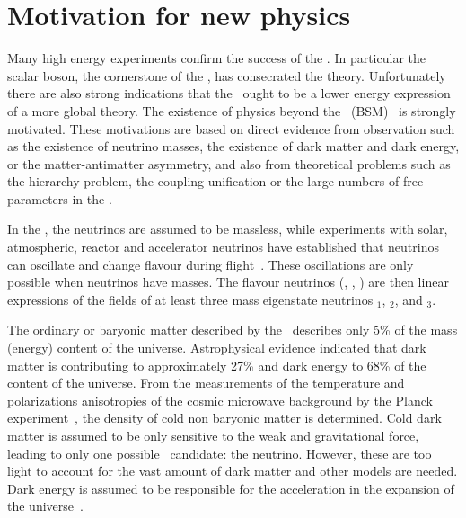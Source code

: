 


\clearpage
\section{Motivation for new physics}
\label{sec:BSM}
Many high energy experiments confirm the success of the \SM. In particular the scalar boson, the cornerstone of the \SM, has consecrated the theory. Unfortunately there are also strong indications that the \SM\ ought to be a lower energy expression of a more global theory. The existence of physics beyond the \SM\ (BSM)~\cite{BSMWiley} is strongly motivated. These motivations are based on direct evidence from observation such as the existence of neutrino masses, the existence of dark matter and dark energy, or the matter-antimatter asymmetry, and also from theoretical problems such as the hierarchy problem, the coupling unification or the large numbers of free parameters in the \SM. 


In the \SM, the neutrinos are assumed to be massless, while experiments with solar, atmospheric, reactor and accelerator neutrinos have established that neutrinos can oscillate and change flavour during flight~\cite{Fukuda:1998mi,PhysRevLett.108.131801}. These oscillations are only possible when neutrinos have masses. The flavour neutrinos (\Pnue, \Pnum, \Pnut) are then linear expressions of the fields of at least three mass eigenstate neutrinos \Pnu$_1$, \Pnu$_2$, and \Pnu$_3$. 

The ordinary or baryonic matter described by the \SM\ describes only 5\% of the mass (energy) content of the universe. Astrophysical evidence indicated that dark matter is contributing to approximately 27\% and dark energy to 68\% of the content of the universe. From the measurements of the temperature and polarizations anisotropies of the cosmic microwave background by the Planck experiment~\cite{Ade:2015xua}, the density of cold non baryonic matter is determined. Cold dark matter is assumed to be only sensitive to the weak and gravitational force, leading to only one possible \SM\ candidate: the neutrino. However, these are too light to account for the vast amount of dark matter and other models are needed. Dark energy is assumed to be responsible for the acceleration in the expansion of the universe~\cite{Peebles:2002gy}. 

